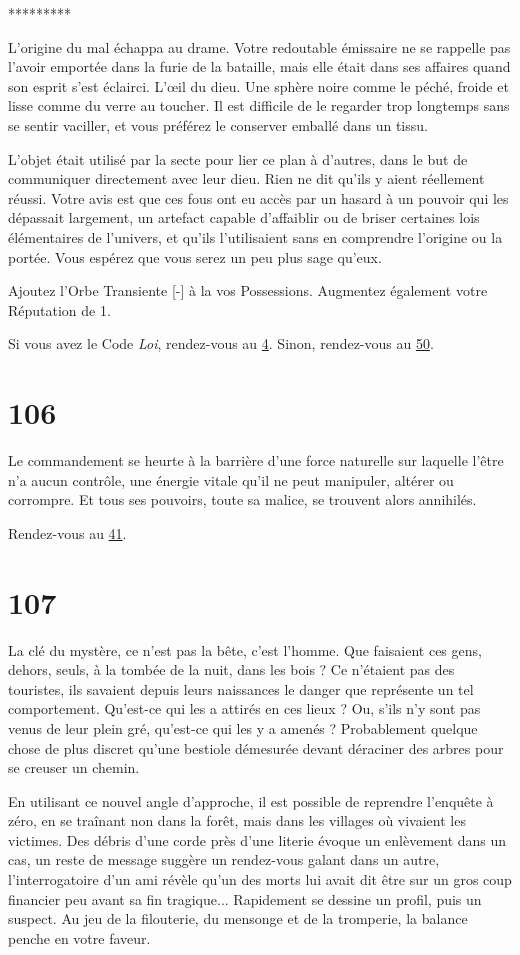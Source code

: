 \documentclass{report}
\newcommand{\gsection}[1]{
    \section{#1}
    \label{section-#1}
}
\newcommand{\glink}[1]{\hyperref[section-#1]{#1}}
\newcommand{\ellipse}{
    \begin{center}
        *********
    \end{center}
}
\begin{document}
\ellipse

L'origine du mal échappa au drame. Votre redoutable émissaire ne se rappelle pas l'avoir emportée dans la furie de la bataille, mais elle était dans ses affaires quand son esprit s'est éclairci. L’œil du dieu. Une sphère noire comme le péché, froide et lisse comme du verre au toucher. Il est difficile de le regarder trop longtemps sans se sentir vaciller, et vous préférez le conserver emballé dans un tissu.

L'objet était utilisé par la secte pour lier ce plan à d'autres, dans le but de communiquer directement avec leur dieu. Rien ne dit qu'ils y aient réellement réussi. Votre avis est que ces fous ont eu accès par un hasard à un pouvoir qui les dépassait largement, un artefact capable d'affaiblir ou de briser certaines lois élémentaires de l'univers, et qu'ils l'utilisaient sans en comprendre l'origine ou la portée. Vous espérez que vous serez un peu plus sage qu'eux.

Ajoutez l'Orbe Transiente [-] à la vos Possessions. Augmentez également votre Réputation de 1.

Si vous avez le Code \emph{Loi}, rendez-vous au \glink{4}. Sinon, rendez-vous au \glink{50}.

\gsection{106}

Le commandement se heurte à la barrière d'une force naturelle sur laquelle l'être n'a aucun contrôle, une énergie vitale qu'il ne peut manipuler, altérer ou corrompre. Et tous ses pouvoirs, toute sa malice, se trouvent alors annihilés.

Rendez-vous au \glink{41}.

\gsection{107}

La clé du mystère, ce n'est pas la bête, c'est l'homme. Que faisaient ces gens, dehors, seuls, à la tombée de la nuit, dans les bois ? Ce n'étaient pas des touristes, ils savaient depuis leurs naissances le danger que représente un tel comportement. Qu'est-ce qui les a attirés en ces lieux ? Ou, s'ils n'y sont pas venus de leur plein gré, qu'est-ce qui les y a amenés ? Probablement quelque chose de plus discret qu'une bestiole démesurée devant déraciner des arbres pour se creuser un chemin.

En utilisant ce nouvel angle d'approche, il est possible de reprendre l'enquête à zéro, en se traînant non dans la forêt, mais dans les villages où vivaient les victimes. Des débris d'une corde près d'une literie évoque un enlèvement dans un cas, un reste de message suggère un rendez-vous galant dans un autre, l'interrogatoire d'un ami révèle qu'un des morts lui avait dit être sur un gros coup financier peu avant sa fin tragique... Rapidement se dessine un profil, puis un suspect. Au jeu de la filouterie, du mensonge et de la tromperie, la balance penche en votre faveur.
\end{document}
